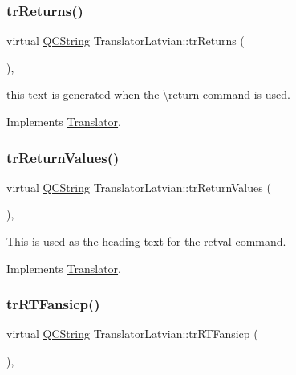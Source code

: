 \subsubsection{\texorpdfstring{trReturns()}{trReturns()}}
{\footnotesize\ttfamily virtual \mbox{\hyperlink{class_q_c_string}{Q\+C\+String}} Translator\+Latvian\+::tr\+Returns (\begin{DoxyParamCaption}{ }\end{DoxyParamCaption})\hspace{0.3cm}{\ttfamily [inline]}, {\ttfamily [virtual]}}

this text is generated when the \textbackslash{}return command is used. 

Implements \mbox{\hyperlink{class_translator}{Translator}}.

\mbox{\label{class_translator_latvian_ab3c10648da834e15c743342b06f37768}} 
\subsubsection{\texorpdfstring{trReturnValues()}{trReturnValues()}}
{\footnotesize\ttfamily virtual \mbox{\hyperlink{class_q_c_string}{Q\+C\+String}} Translator\+Latvian\+::tr\+Return\+Values (\begin{DoxyParamCaption}{ }\end{DoxyParamCaption})\hspace{0.3cm}{\ttfamily [inline]}, {\ttfamily [virtual]}}

This is used as the heading text for the retval command. 

Implements \mbox{\hyperlink{class_translator}{Translator}}.

\mbox{\label{class_translator_latvian_a69eda1383838391ddc6633bb881d0df4}} 
\subsubsection{\texorpdfstring{trRTFansicp()}{trRTFansicp()}}
{\footnotesize\ttfamily virtual \mbox{\hyperlink{class_q_c_string}{Q\+C\+String}} Translator\+Latvian\+::tr\+R\+T\+Fansicp (\begin{DoxyParamCaption}{ }\end{DoxyParamCaption})\hspace{0.3cm}{\ttfamily [inline]}, {\ttfamily [virtual]}}

